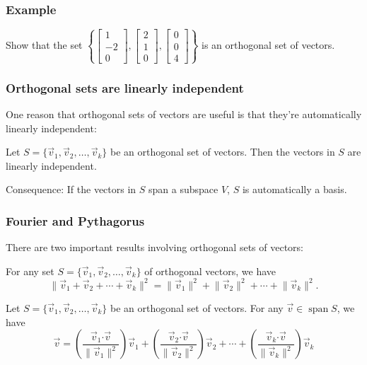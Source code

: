 \documentclass[11pt,t]{beamer}
\DeclareMathOperator{\spn}{span}
\newcommand{\len}[1]{\lVert #1\rVert}
\newcommand{\dotp}{\boldsymbol{\cdot}}
\begin{document}
\begin{frame}\frametitle{Example}
Show that the set $\displaystyle \left\{\begin{bmatrix}1\\-2\\0\end{bmatrix},\begin{bmatrix}2\\1\\0\end{bmatrix},\begin{bmatrix}0\\0\\4\end{bmatrix}\right\}$ is an orthogonal set of vectors.
\end{frame}
\begin{frame}\frametitle{Orthogonal sets are linearly independent}
 One reason that orthogonal sets of vectors are useful is that they're automatically linearly independent:
\begin{theorem}
 Let $S=\{\vec{v}_1,\vec{v}_2,\ldots, \vec{v}_k\}$ be an orthogonal set of vectors. Then the vectors in $S$ are linearly independent.
\end{theorem}
\alert{Consequence:} If the vectors in $S$ span a subspace $V$, $S$ is automatically a basis.
\end{frame}
\begin{frame}\frametitle{Fourier and Pythagorus}
 There are two important results involving orthogonal sets of vectors:
\begin{theorem}
 For any set $S=\{\vec{v}_1,\vec{v}_2,\ldots, \vec{v}_k\}$ of orthogonal vectors, we have
\[
 \len{\vec{v}_1+\vec{v}_2+\cdots + \vec{v}_k}^2 = \len{\vec{v}_1}^2+\len{\vec{v}_2}^2+\cdots + \len{\vec{v}_k}^2.
\]
\end{theorem}
\begin{theorem}
 Let $S=\{\vec{v}_1,\vec{v}_2,\ldots, \vec{v}_k\}$ be an orthogonal set of vectors. For any $\vec{v}\in \spn S$, we have
\[
 \vec{v} = \left(\frac{\vec{v}_1\dotp\vec{v}}{\len{\vec{v}_1}^2}\right)\vec{v}_1+\left(\frac{\vec{v}_2\dotp\vec{v}}{\len{\vec{v}_2}^2}\right)\vec{v}_2+\cdots +\left(\frac{\vec{v}_k\dotp\vec{v}}{\len{\vec{v}_k}^2}\right)\vec{v}_k
\]

\end{theorem}

\end{frame}
\end{document}
